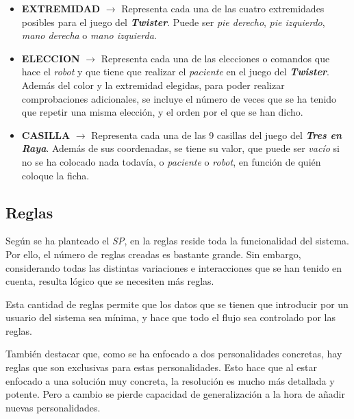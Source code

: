 \documentclass{uc3mpracticas}
\begin{document}
\begin{itemize}
    \item \textbf{EXTREMIDAD} $\rightarrow$ Representa cada una de las cuatro extremidades posibles para el juego del \textbf{\textit{Twister}}. Puede ser \textit{pie derecho}, \textit{pie izquierdo}, \textit{mano derecha} o \textit{mano izquierda}.

    \item \textbf{ELECCION} $\rightarrow$ Representa cada una de las elecciones o comandos que hace el \textit{robot} y que tiene que realizar el \textit{paciente} en el juego del \textbf{\textit{Twister}}. Además del color y la extremidad elegidas, para poder realizar comprobaciones adicionales, se incluye el número de veces que se ha tenido que repetir una misma elección, y el orden por el que se han dicho.

    \item \textbf{CASILLA} $\rightarrow$ Representa cada una de las 9 casillas del juego del \textit{\textbf{Tres en Raya}}. Además de sus coordenadas, se tiene su valor, que puede ser \textit{vacío} si no se ha colocado nada todavía, o \textit{paciente} o \textit{robot}, en función de quién coloque la ficha.
  \end{itemize}



  \subsection{Reglas}

  Según se ha planteado el \textit{SP}, en la reglas reside toda la funcionalidad del sistema. Por ello, el número de reglas creadas es bastante grande. Sin embargo, considerando todas las distintas variaciones e interacciones que se han tenido en cuenta, resulta lógico que se necesiten más reglas.

  \vspace{1mm}

  Esta cantidad de reglas permite que los datos que se tienen que introducir por un usuario del sistema sea mínima, y hace que todo el flujo sea controlado por las reglas.

  \vspace{2mm}

  También destacar que, como se ha enfocado a dos personalidades concretas, hay reglas que son exclusivas para estas personalidades. Esto hace que al estar enfocado a una solución muy concreta, la resolución es mucho más detallada y potente. Pero a cambio se pierde capacidad de generalización a la hora de añadir nuevas personalidades.
\end{document}
